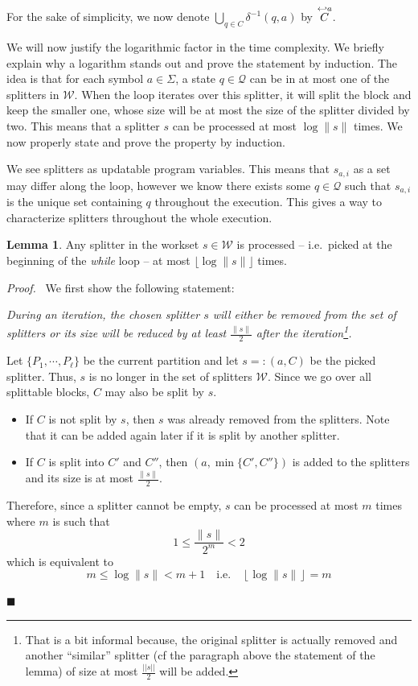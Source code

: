 \documentclass[12pt, a4 paper]{article}
\renewenvironment{proof}[1][Proof]{\begin{mdframed}[backgroundcolor=black!5, topline=false, rightline=false, bottomline=false, linecolor=black!15, linewidth=3pt]{\noindent\textit{#1.}\ }}{\noindent\par\hfill$\blacksquare$\end{mdframed}}
\theoremstyle{definition}
\newtheorem{lemma}{Lemma}
\begin{document}
For the sake of simplicity, we now denote $\displaystyle{\bigcup_{q \in C} \delta^{-1}(q, a)}$ by $\overset{\hookleftarrow {a}}{C}$.

We will now justify the logarithmic factor in the time complexity.
We briefly explain why a logarithm stands out and prove the statement by induction.
The idea is that for each symbol $a \in \Sigma$, a state $q \in \mathcal{Q}$ can be in at most one of the splitters in $\mathcal{W}$.
When the loop iterates over this splitter, it will split the block and keep the smaller one, whose size will be at most the size of the splitter divided by two.
This means that a splitter $s$ can be processed at most $\log \| s \|$ times.
We now properly state and prove the property by induction.

We see splitters as updatable program variables.
This means that $s_{a,i}$ as a set may differ along the loop, however we know there exists some $q \in \mathcal{Q}$ such that $s_{a,i}$ is the unique set containing $q$ throughout the execution.
This gives a way to characterize splitters throughout the whole execution.

\bigskip

\begin{lemma}\label{lem:log}
    Any splitter in the workset $s \in \mathcal{W}$ is processed -- i.e.\ picked at the beginning of the \textit{while} loop -- at most $\lfloor \log \| s \| \rfloor$ times.
\end{lemma}
\begin{proof}
    We first show the following statement:

    \textit{During an iteration, the chosen splitter $s$ will either be removed from the set of splitters or its size will be reduced by at least $\frac{\| s\|}{2}$ after the iteration\footnote{That is a bit informal because, the original splitter is actually removed and another ``similar'' splitter (cf the paragraph above the statement of the lemma) of size at most $\frac{||s||}{2}$ will be added.}.}

    \bigskip
    Let $\{P_1, \cdots, P_\ell\}$ be the current partition and let $s =: (a, C)$ be the picked splitter. Thus, $s$ is no longer in the set of splitters $\mathcal{W}$. Since we go over all splittable blocks, $C$ may also be split by $s$.
    \begin{itemize}
        \item If $C$ is not split by $s$, then $s$ was already removed from the splitters. Note that it can be added again later if it is split by another splitter.
        \item If $C$ is split into $C'$ and $C''$, then $(a, \min\{C', C''\})$ is added to the splitters and its size is at most $\frac{\| s \|}{2}$.
    \end{itemize}
    Therefore, since a splitter cannot be empty, $s$ can be processed at most $m$ times where $m$ is such that
    $$ 1 \leq \frac{\| s \|}{2^m} < 2$$
    which is equivalent to
    $$ m \leq \log \| s \| < m + 1 \quad \text{i.e.}\quad \left\lfloor\log \| s \|\right\rfloor = m $$
\end{proof}
\end{document}

